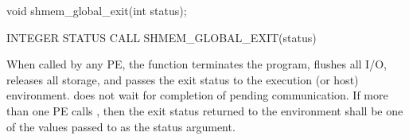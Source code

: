 \synC
void shmem_global_exit(int status); %

\synF
INTEGER STATUS
CALL SHMEM_GLOBAL_EXIT(status) %


{
       When called by any  \ac{PE}, the   function terminates the 
       \openshmem program, \color{red} flushes all I/O, releases all storage, \color{black}and passes the 
       exit status to the execution (or host) environment. %
         does not wait for completion of pending communication. 
       If more than one \ac{PE} calls  , then the exit status returned to the environment 
       shall be one of the values passed to  as the status argument.
}
{
}
\eAPI
